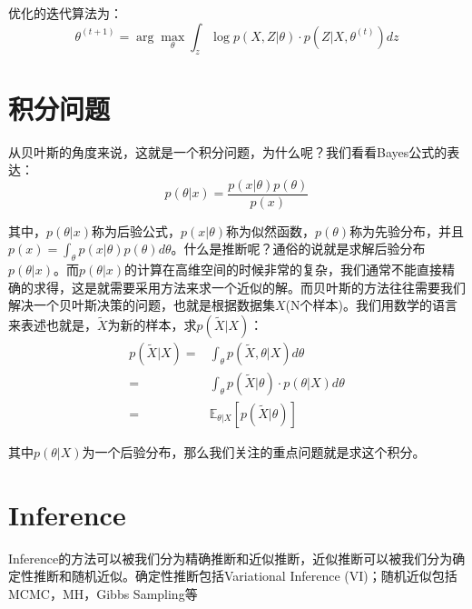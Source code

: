\documentclass[a4paper]{article}
\begin{document}
优化的迭代算法为：
\begin{equation}
    \theta^{(t+1)} = \arg\max_{\theta}\int_{z} \log p(X,Z|\theta)\cdot p(Z|X,\theta^{(t)}) dz
\end{equation}

\section{积分问题}
从贝叶斯的角度来说，这就是一个积分问题，为什么呢？我们看看Bayes公式的表达：
\begin{equation}
    p(\theta|x) = \frac{p(x|\theta)p(\theta)}{p(x)} 
\end{equation}

其中，$p(\theta|x)$称为后验公式，$p(x|\theta)$称为似然函数，$p(\theta)$称为先验分布，并且$p(x) = \int_{\theta}p(x|\theta)p(\theta)d\theta$。什么是推断呢？通俗的说就是求解后验分布$p(\theta|x)$。而$p(\theta|x)$的计算在高维空间的时候非常的复杂，我们通常不能直接精确的求得，这是就需要采用方法来求一个近似的解。而贝叶斯的方法往往需要我们解决一个贝叶斯决策的问题，也就是根据数据集$X$(N个样本)。我们用数学的语言来表述也就是，$\widetilde{X}$为新的样本，求$p(\widetilde{X}|X)$：
\begin{equation}
    \begin{split}
        p(\widetilde{X}|X) 
        = & \int_{\theta} p(\widetilde{X},\theta|X) d\theta \\
        = & \int_{\theta} p(\widetilde{X}|\theta)\cdot p(\theta|X)d\theta \\
        = & \mathbb{E}_{\theta|X} [p(\widetilde{X}|\theta)]
    \end{split}
\end{equation}

其中$p(\theta|X)$为一个后验分布，那么我们关注的重点问题就是求这个积分。
\section{Inference}
Inference的方法可以被我们分为精确推断和近似推断，近似推断可以被我们分为确定性推断和随机近似。确定性推断包括Variational Inference (VI)；随机近似包括MCMC，MH，Gibbs Sampling等
\end{document}
